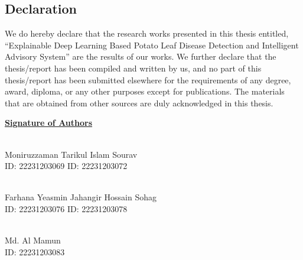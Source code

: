 \begin{center}
    \section*{Declaration}
\end{center}
\large 

We do hereby declare that the research works presented in this thesis entitled, ``Explainable Deep Learning Based Potato Leaf Disease Detection and Intelligent Advisory System'' are the results of our works. We further declare that the thesis/report has been compiled and written by us, and no part of this thesis/report has been submitted elsewhere for the requirements of any degree, award, diploma, or any other purposes except for publications. The materials that are obtained from other sources are duly acknowledged in this thesis.

\vspace{10mm}
\begin{flushleft}

\textbf{\underline{Signature of Authors}} \null\hfill  

\vspace{10mm}

\underline{\hspace{5cm}} \null\hfill 
\underline{\hspace{5cm}}\\
Moniruzzaman \null\hfill   Tarikul Islam Sourav \\
ID: 22231203069  \null\hfill  ID: 22231203072 \\

\vspace{5mm}

\underline{\hspace{5cm}} \null\hfill 
\underline{\hspace{5cm}}\\
Farhana Yeasmin  \null\hfill   Jahangir Hossain Sohag\\
ID: 22231203076  \null\hfill  ID: 22231203078\\

\vspace{5mm}

\underline{\hspace{5cm}}\\
Md. Al Mamun\\
ID: 22231203083 \\ 

\end{flushleft}
